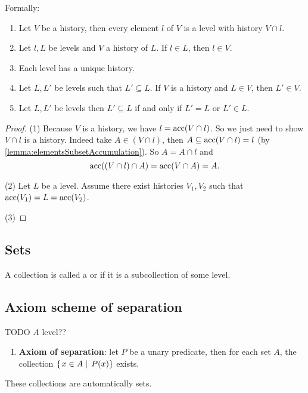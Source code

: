 Formally:
\begin{proposition}
\begin{enumerate}
\item Let $V$ be a history, then every element $l$ of $V$ is a level with history $V\cap l$.

\item Let $l,L$ be levels and $V$ a history of $L$. If $l\in L$, then $l\in V$.

\item Each level has a unique history.

\item Let $L, L'$ be levels such that $L' \subseteq L$. If $V$ is a history and $L\in V$, then $L'\in V$.
\item Let $L, L'$ be levels then $L'\subseteq L$ \textup{if and only if} $L' = L$ or $L'\in L$.
\end{enumerate}
\end{proposition}
\begin{proof}
(1) Because $V$ is a history, we have $l = \operatorname{acc}(V\cap l)$. So we just need to show $V\cap l$ is a history. Indeed take $A\in (V\cap l)$, then $A \subseteq \operatorname{acc}(V\cap l) = l$ (by \ref{lemma:elementsSubsetAccumulation}). So $A = A\cap l$ and
\[ \operatorname{acc}((V\cap l)\cap A) = \operatorname{acc}(V\cap A) = A. \]

(2) Let $L$ be a level. Assume there exist histories $V_1, V_2$ such that $\operatorname{acc}(V_1) = L = \operatorname{acc}(V_2)$.

(3)
\end{proof}




\subsection{Sets}
\begin{definition}
A collection is called a  or  if it is a subcollection of some level.
\end{definition}

\subsection{Axiom scheme of separation}
TODO $A$ level??
\begin{enumerate}[(I)]
\item \textbf{Axiom of separation}: let $P$ be a unary predicate, then for each set $A$, the collection $\left\{\left. x\in A \;\right|\; P(x) \right\}$ exists.
\end{enumerate}
These collections are automatically sets.


